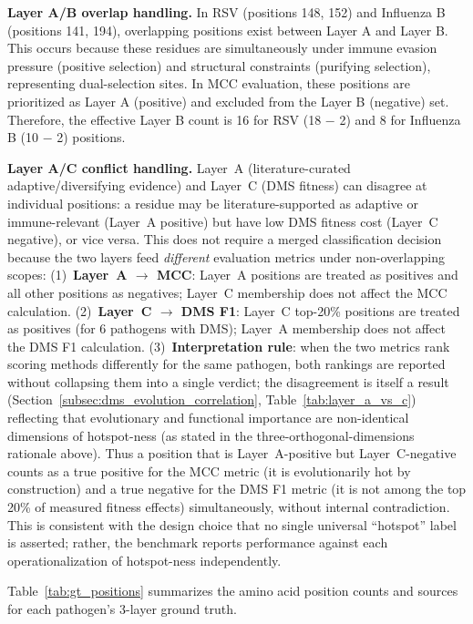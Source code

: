 \textbf{Layer A/B overlap handling.}
In RSV (positions 148, 152) and Influenza B (positions 141, 194), overlapping positions exist between Layer A and Layer B.
This occurs because these residues are simultaneously under immune evasion pressure (positive selection) and structural constraints (purifying selection), representing dual-selection sites.
In MCC evaluation, these positions are prioritized as Layer A (positive) and excluded from the Layer B (negative) set.
Therefore, the effective Layer B count is 16 for RSV (18 $-$ 2) and 8 for Influenza B (10 $-$ 2) positions.

\textbf{Layer A/C conflict handling.}
Layer~A (literature-curated adaptive/diversifying evidence) and Layer~C (DMS fitness) can disagree at individual positions: a residue may be literature-supported as adaptive or immune-relevant (Layer~A positive) but have low DMS fitness cost (Layer~C negative), or vice versa. This does not require a merged classification decision because the two layers feed \textit{different} evaluation metrics under non-overlapping scopes:
(1)~\textbf{Layer~A $\to$ MCC}: Layer~A positions are treated as positives and all other positions as negatives; Layer~C membership does not affect the MCC calculation.
(2)~\textbf{Layer~C $\to$ DMS F1}: Layer~C top-20\% positions are treated as positives (for 6 pathogens with DMS); Layer~A membership does not affect the DMS F1 calculation.
(3)~\textbf{Interpretation rule}: when the two metrics rank scoring methods differently for the same pathogen, both rankings are reported without collapsing them into a single verdict; the disagreement is itself a result (Section~\ref{subsec:dms_evolution_correlation}, Table~\ref{tab:layer_a_vs_c}) reflecting that evolutionary and functional importance are non-identical dimensions of hotspot-ness (as stated in the three-orthogonal-dimensions rationale above).
Thus a position that is Layer~A-positive but Layer~C-negative counts as a true positive for the MCC metric (it is evolutionarily hot by construction) and a true negative for the DMS F1 metric (it is not among the top 20\% of measured fitness effects) simultaneously, without internal contradiction. This is consistent with the design choice that no single universal ``hotspot'' label is asserted; rather, the benchmark reports performance against each operationalization of hotspot-ness independently.

Table~\ref{tab:gt_positions} summarizes the amino acid position counts and sources for each pathogen's 3-layer ground truth.

